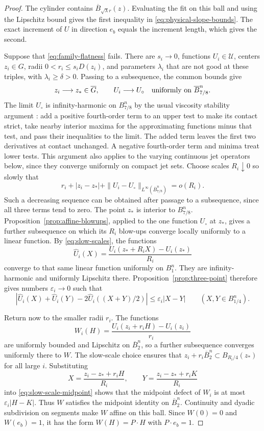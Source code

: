 \documentclass[11pt]{article}
\numberwithin{equation}{section}
\theoremstyle{definition}
\theoremstyle{remark}
\begin{document}
\begin{proof}
The cylinder contains $\overline B_{\sqrt\lambda r}(z)$. Evaluating the fit on this ball and using the Lipschitz bound gives the first inequality in \eqref{eq:physical-slope-bounds}. The exact increment of $U$ in direction $e_b$ equals the increment length, which gives the second.

Suppose that \eqref{eq:family-flatness} fails. There are $s_i\to0$, functions $U_i\in\mathcal U$, centers $z_i\in G$, radii $0<r_i\le s_iD(z_i)$, and parameters $\lambda_i$ that are not good at these triples, with $\lambda_i\ge\delta>0$. Passing to a subsequence, the common bounds give
\[
  z_i\longrightarrow z_*\in\overline G,\qquad
  U_i\longrightarrow U_\circ
       \quad\hbox{uniformly on }\overline B_{7/8}^n.
\]
The limit $U_\circ$ is infinity-harmonic on $B_{7/8}^n$ by the usual viscosity stability argument \cite[Section~6]{CIL1992}: add a positive fourth-order term to an upper test to make its contact strict, take nearby interior maxima for the approximating functions minus that test, and pass their inequalities to the limit. The added term leaves the first two derivatives at contact unchanged. A negative fourth-order term and minima treat lower tests. This argument also applies to the varying continuous jet operators below, since they converge uniformly on compact jet sets. Choose scales $R_i\downarrow0$ so slowly that
\begin{equation}\label{eq:slow-scales}
  r_i+|z_i-z_*|+
    \|U_i-U_\circ\|_{L^\infty(\overline B_{7/8}^n)}=o(R_i).
\end{equation}
Such a decreasing sequence can be obtained after passage to a subsequence, since all three terms tend to zero. The point $z_*$ is interior to $B_{7/8}^n$. Proposition~\ref{prop:affine-blowups}, applied to the one function $U_\circ$ at $z_*$, gives a further subsequence on which its $R_i$ blow-ups converge locally uniformly to a linear function. By \eqref{eq:slow-scales}, the functions
\[
  \widehat U_i(X)=
    \frac{U_i(z_*+R_iX)-U_i(z_*)}{R_i}
\]
converge to that same linear function uniformly on $B_1^n$. They are infinity-harmonic and uniformly Lipschitz there. Proposition~\ref{prop:three-point} therefore gives numbers $\varepsilon_i\to0$ such that
\begin{equation}\label{eq:slow-scale-midpoint}
  |\widehat U_i(X)+\widehat U_i(Y)
       -2\widehat U_i((X+Y)/2)|\le\varepsilon_i|X-Y|
       \qquad (X,Y\in B_{1/4}^n).
\end{equation}

Return now to the smaller radii $r_i$. The functions
\[
  W_i(H)=\frac{U_i(z_i+r_iH)-U_i(z_i)}{r_i}
\]
are uniformly bounded and Lipschitz on $\overline B_2^n$, so a further subsequence converges uniformly there to $W$. The slow-scale choice ensures that $z_i+r_i\overline B_2^n\subset B_{R_i/4}(z_*)$ for all large $i$. Substituting
\[
  X=\frac{z_i-z_*+r_iH}{R_i},\qquad
  Y=\frac{z_i-z_*+r_iK}{R_i}
\]
into \eqref{eq:slow-scale-midpoint} shows that the midpoint defect of $W_i$ is at most $\varepsilon_i|H-K|$. Thus $W$ satisfies the midpoint identity on $\overline B_2^n$. Continuity and dyadic subdivision on segments make $W$ affine on this ball. Since $W(0)=0$ and $W(e_b)=1$, it has the form $W(H)=P\cdot H$ with $P\cdot e_b=1$.


\end{proof}
\end{document}
